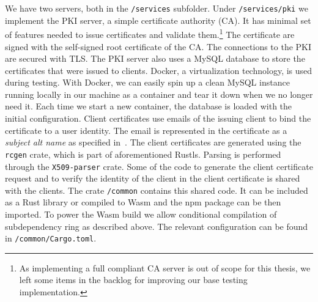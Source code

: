 We have two servers, both in the \texttt{/services} subfolder.
Under \texttt{/services/pki} we implement the PKI server, a simple certificate authority (CA).
It has minimal set of features needed to issue certificates
and validate them.\footnote{As implementing a full compliant CA server is out of scope for this thesis, we left some items in the backlog for improving our base testing implementation.}
The certificate are signed with the
self-signed root certificate of the CA.
The connections to the PKI are secured with TLS.
The PKI server also uses a MySQL database to store the certificates that were issued to clients.
Docker, a virtualization technology, is used during testing. 
With Docker, we can easily spin up a clean MySQL instance running 
locally in our machine as a container and tear it down when we no longer
need it. Each time we start a new container, the database is loaded
with the initial configuration. 
Client certificates use emails of the issuing client to bind the certificate to
a user identity.
The email is represented in the certificate as a \textit{subject alt name} as specified in~\cite{rfc5280}.
The client certificates are generated using the
\texttt{rcgen} crate, which is part of aforementioned Rustls. 
Parsing is performed through
the \texttt{X509-parser} crate. Some of the code
to generate the client certificate request and to
verify the identity of the client in the client certificate
is shared with the clients. 
The crate \texttt{/common} contains this shared code.
It can be included as a Rust library or
compiled to Wasm and the npm package can be then
imported. To power the Wasm build we allow
conditional compilation of subdependency ring as
described above.
The relevant configuration can be found in
\texttt{/common/Cargo.toml}.


